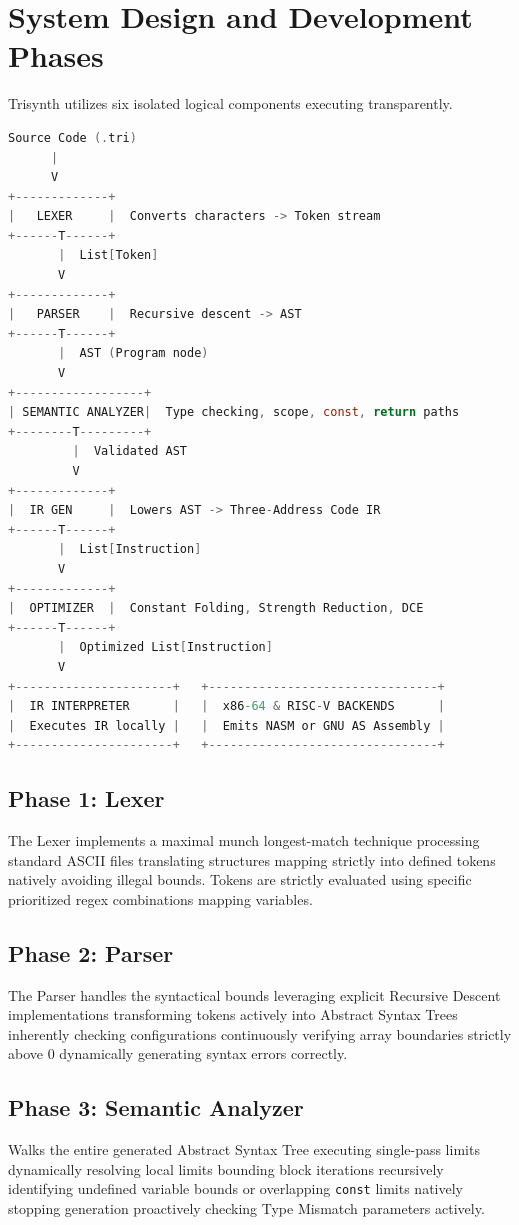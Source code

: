 \documentclass[12pt,a4paper]{article}
\begin{document}
\section{System Design and Development Phases}
Trisynth utilizes six isolated logical components executing transparently.

\begin{lstlisting}[language=C, title=Trisynth System Architecture Design Pipeline]
Source Code (.tri)
      |
      V
+-------------+
|   LEXER     |  Converts characters -> Token stream
+------T------+
       |  List[Token]
       V
+-------------+
|   PARSER    |  Recursive descent -> AST
+------T------+
       |  AST (Program node)
       V
+------------------+
| SEMANTIC ANALYZER|  Type checking, scope, const, return paths
+--------T---------+
         |  Validated AST
         V
+-------------+
|  IR GEN     |  Lowers AST -> Three-Address Code IR
+------T------+
       |  List[Instruction]
       V
+-------------+
|  OPTIMIZER  |  Constant Folding, Strength Reduction, DCE
+------T------+
       |  Optimized List[Instruction]
       V
+----------------------+   +--------------------------------+
|  IR INTERPRETER      |   |  x86-64 & RISC-V BACKENDS      |
|  Executes IR locally |   |  Emits NASM or GNU AS Assembly |
+----------------------+   +--------------------------------+
\end{lstlisting}

\subsection{Phase 1: Lexer}
The Lexer implements a maximal munch longest-match technique processing standard ASCII files translating structures mapping strictly into defined tokens natively avoiding illegal bounds. Tokens are strictly evaluated using specific prioritized regex combinations mapping variables.

\subsection{Phase 2: Parser}
The Parser handles the syntactical bounds leveraging explicit Recursive Descent implementations transforming tokens actively into Abstract Syntax Trees inherently checking configurations continuously verifying array boundaries strictly above $0$ dynamically generating syntax errors correctly.

\subsection{Phase 3: Semantic Analyzer}
Walks the entire generated Abstract Syntax Tree executing single-pass limits dynamically resolving local limits bounding block iterations recursively identifying undefined variable bounds or overlapping \texttt{const} limits natively stopping generation proactively checking Type Mismatch parameters actively.
\end{document}
